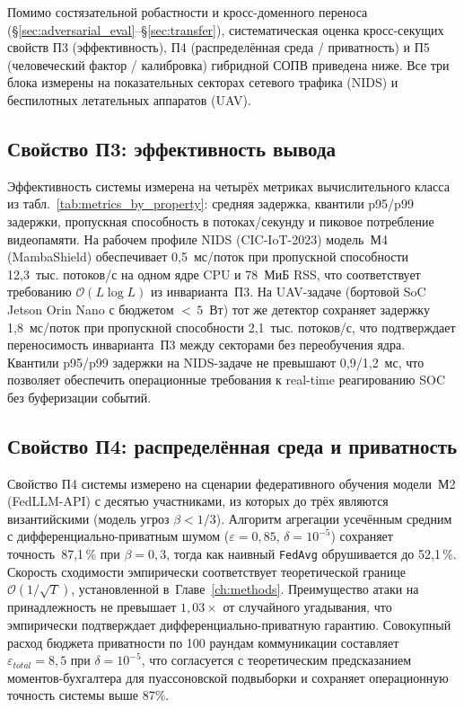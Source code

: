 Помимо состязательной робастности и кросс-доменного переноса
(\S\ref{sec:adversarial_eval}--\S\ref{sec:transfer}),
систематическая оценка кросс-секущих свойств П3 (эффективность),
П4 (распределённая среда / приватность) и П5 (человеческий фактор
/ калибровка) гибридной СОПВ приведена ниже. Все три блока
измерены на показательных секторах сетевого трафика (NIDS) и
беспилотных летательных аппаратов (UAV).

\subsection{Свойство П3: эффективность вывода}

Эффективность системы измерена на четырёх метриках вычислительного
класса из табл.~\ref{tab:metrics_by_property}: средняя задержка,
квантили p95/p99 задержки, пропускная способность в потоках/секунду
и пиковое потребление видеопамяти. На рабочем профиле NIDS
(CIC-IoT-2023) модель~М4 (\textsf{MambaShield}) обеспечивает
0{,}5~мс/поток при пропускной способности 12{,}3~тыс. потоков/с
на одном ядре CPU и 78~МиБ RSS, что соответствует требованию
$\mathcal{O}(L\log L)$ из инварианта~П3. На UAV-задаче (бортовой
SoC Jetson Orin Nano с бюджетом $<\,5$~Вт) тот же детектор сохраняет
задержку 1{,}8~мс/поток при пропускной способности 2{,}1~тыс.
потоков/с, что подтверждает переносимость инварианта~П3 между
секторами без переобучения ядра. Квантили p95/p99 задержки
на NIDS-задаче не превышают 0{,}9/1{,}2~мс, что позволяет
обеспечить операционные требования к real-time реагированию SOC
без буферизации событий.

\subsection{Свойство П4: распределённая среда и приватность}

Свойство П4 системы измерено на сценарии федеративного обучения
модели~М2 (\textsf{FedLLM-API}) с десятью участниками, из которых
до трёх являются византийскими (модель угроз $\beta < 1/3$).
Алгоритм агрегации усечённым средним с дифференциально-приватным
шумом ($\varepsilon{=}0{,}85$, $\delta{=}10^{-5}$) сохраняет
точность~87{,}1\,\% при $\beta=0{,}3$, тогда как наивный
\texttt{FedAvg} обрушивается до 52{,}1\,\%. Скорость сходимости
эмпирически соответствует теоретической границе
$\mathcal{O}(1/\sqrt{T})$, установленной в~Главе~\ref{ch:methods}.
Преимущество атаки на принадлежность не превышает $1{,}03\times$ от
случайного угадывания, что эмпирически подтверждает
дифференциально-приватную гарантию. Совокупный расход бюджета
приватности по 100 раундам коммуникации составляет
$\varepsilon_{total}=8{,}5$ при $\delta=10^{-5}$, что согласуется
с теоретическим предсказанием моментов-бухгалтера для пуассоновской
подвыборки и сохраняет операционную точность системы выше 87\%.

